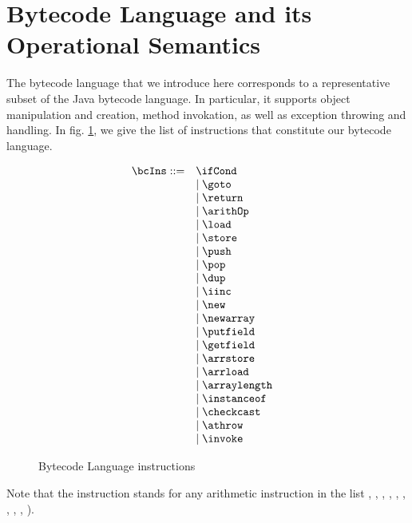 


\section{Bytecode Language and its Operational Semantics} \label{opSem}
 The bytecode language that we introduce here corresponds to a representative subset of the Java bytecode language. 
 In particular, it supports object manipulation and creation, method invokation, as well as exception throwing and handling.
 In fig. \ref{opSem:bclang}, we give the list of instructions that constitute our bytecode
 language.
 
 \begin{figure}[h] 
      $$  \begin{array}{lll}
             \bcIns ::= & \ifCond & \\
	                & \mid \goto  & \\ 
			& \mid \return  &\\ 
			& \mid \arithOp  & \\ 
			& \mid \load & \\ 
			& \mid \store & \\
			& \mid \push & \\
			& \mid \pop & \\
			& \mid \dup & \\
			& \mid \iinc & \\
			& \mid \new & \\
			& \mid \newarray &  \\ 	
			& \mid \putfield  & \\
			& \mid \getfield  & \\
			& \mid \arrstore &  \\
			& \mid \arrload  & \\
			& \mid \arraylength  & \\
			& \mid \instanceof  & \\
			& \mid \checkcast &  \\
			& \mid \athrow  & \\
			& \mid \invoke  & \\
	\end{array}$$
        \caption{Bytecode Language instructions }
        \label{opSem:bclang}
  \end{figure}  
 	 
 Note that the instruction \arithOp stands for any arithmetic instruction in the list  , , , 
 , ,  , , , ,  ).
 


